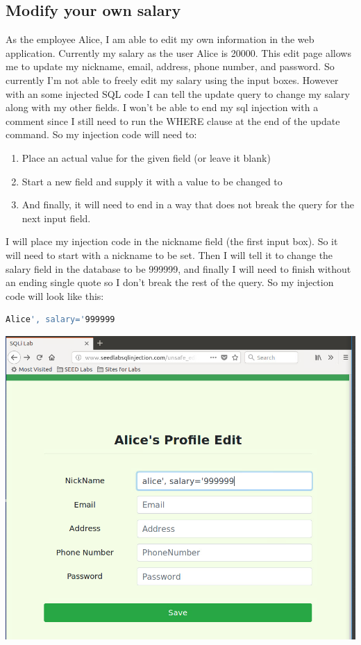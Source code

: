 \documentclass[14pt]{extarticle}
\begin{document}
\subsection{Modify your own salary}
As the employee Alice, I am able to edit my own information in the web application. Currently my salary as the user Alice is 20000\cite{seed-sqlatk}. This edit page allows me to update my nickname, email, address, phone number, and password. So currently I'm not able to freely edit my salary using the input boxes. However with an some injected SQL code I can tell the update query to change my salary along with my other fields. I won't be able to end my sql injection with a comment since I still need to run the WHERE clause at the end of the update command. So my injection code will need to:
\begin{enumerate}
	\item Place an actual value for the given field (or leave it blank)
	\item Start a new field and supply it with a value to be changed to
	\item And finally, it will need to end in a way that does not break the query for the next input field.
\end{enumerate}
I will place my injection code in the nickname field (the first input box). So it will need to start with a nickname to be set. Then I will tell it to change the salary field in the database to be 999999, and finally I will need to finish without an ending single quote so I don't break the rest of the query. So my injection code will look like this:
\begin{lstlisting}[language=sh]
Alice', salary='999999
\end{lstlisting}
\begin{center}
	\includegraphics[width=0.6\linewidth]{alice-editing}\\
\end{center}
\end{document}
